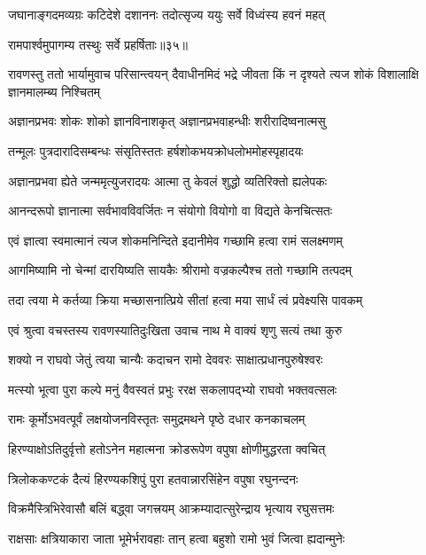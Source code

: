 \twolineshloka
{जघानाङ्गदमव्यग्रः कटिदेशे दशाननः}
{तदोत्सृज्य ययुः सर्वे विध्वंस्य हवनं महत्} %

{रामपार्श्वमुपागम्य तस्थुः सर्वे प्रहर्षिताः॥३५॥} %


\threelineshloka
{रावणस्तु ततो भार्यामुवाच परिसान्त्वयन्}
{दैवाधीनमिदं भद्रे जीवता किं न दृश्यते}
{त्यज शोकं विशालाक्षि ज्ञानमालम्ब्य निश्चितम्} %

\twolineshloka
{अज्ञानप्रभवः शोकः शोको ज्ञानविनाशकृत्}
{अज्ञानप्रभवाहन्धीः शरीरादिष्वनात्मसु} %

\twolineshloka
{तन्मूलः पुत्रदारादिसम्बन्धः संसृतिस्ततः}
{हर्षशोकभयक्रोधलोभमोहस्पृहादयः} %

\twolineshloka
{अज्ञानप्रभवा ह्येते जन्ममृत्युजरादयः}
{आत्मा तु केवलं शुद्धो व्यतिरिक्तो ह्यलेपकः} %

\twolineshloka
{आनन्दरूपो ज्ञानात्मा सर्वभावविवर्जितः}
{न संयोगो वियोगो वा विद्यते केनचित्सतः} %

\twolineshloka
{एवं ज्ञात्वा स्वमात्मानं त्यज शोकमनिन्दिते}
{इदानीमेव गच्छामि हत्वा रामं सलक्ष्मणम्} %

\twolineshloka
{आगमिष्यामि नो चेन्मां दारयिष्यति सायकैः}
{श्रीरामो वज्रकल्पैश्च ततो गच्छामि तत्पदम्} %

\twolineshloka
{तदा त्वया मे कर्तव्या क्रिया मच्छासनात्प्रिये}
{सीतां हत्वा मया सार्धं त्वं प्रवेक्ष्यसि पावकम्} %

\twolineshloka
{एवं श्रुत्वा वचस्तस्य रावणस्यातिदुःखिता}
{उवाच नाथ मे वाक्यं शृणु सत्यं तथा कुरु} %

\twolineshloka
{शक्यो न राघवो जेतुं त्वया चान्यैः कदाचन}
{रामो देववरः साक्षात्प्रधानपुरुषेश्वरः} %

\twolineshloka
{मत्स्यो भूत्वा पुरा कल्पे मनुं वैवस्वतं प्रभुः}
{ररक्ष सकलापद्भ्यो राघवो भक्तवत्सलः} %

\twolineshloka
{रामः कूर्मोऽभवत्पूर्वं लक्षयोजनविस्तृतः}
{समुद्रमथने पृष्ठे दधार कनकाचलम्} %

\twolineshloka
{हिरण्याक्षोऽतिदुर्वृत्तो हतोऽनेन महात्मना}
{क्रोडरूपेण वपुषा क्षोणीमुद्धरता क्वचित्} %

\twolineshloka
{त्रिलोककण्टकं दैत्यं हिरण्यकशिपुं पुरा}
{हतवान्नारसिंहेन वपुषा रघुनन्दनः} %

\twolineshloka
{विक्रमैस्त्रिभिरेवासौ बलिं बद्ध्वा जगत्त्रयम्}
{आक्रम्यादात्सुरेन्द्राय भृत्याय रघुसत्तमः} %

\twolineshloka
{राक्षसाः क्षत्रियाकारा जाता भूमेर्भरावहाः}
{तान् हत्वा बहुशो रामो भुवं जित्वा ह्यदान्मुनेः} %

